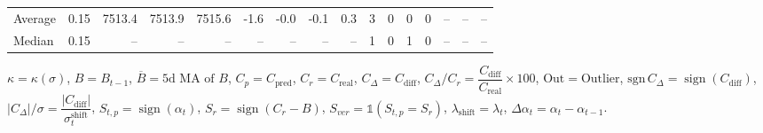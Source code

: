 \begin{threeparttable}
{\begin{tabular}{lrrrrrrrrrrrrrrr}
Average &     0.15 & 7513.4 & 7513.9 & 7515.6 &       -1.6 &           -0.0 &                     -0.1 &                 0.3 &              3 &         0 &     0 &         0 &         -- &        -- &             -- \\
 Median &     0.15 &     -- &     -- &     -- &         -- &             -- &                       -- &                  -- &              1 &         0 &     1 &         0 &         -- &        -- &             -- \\
\bottomrule
\end{tabular}
}
\begin{tablenotes}\footnotesize
\item $\kappa=\kappa(\sigma)$, $B=B_{t-1}$, $\overline{B}=\text{5d MA of }B$, $C_p=C_{\text{pred}}$, $C_r=C_{\text{real}}$, $C_\Delta=C_{\text{diff}}$, $C_\Delta/C_r=\dfrac{C_{\text{diff}}}{C_{\text{real}}}\times100$, $\mathrm{Out}=\text{Outlier}$, $\mathrm{sgn}\,C_\Delta=\operatorname{sign}(C_{\text{diff}})$, $|C_\Delta|/\sigma=\dfrac{|C_{\text{diff}}|}{\sigma_t^{\text{shift}}}$, $S_{t,p}=\operatorname{sign}(\alpha_t)$, $S_r=\operatorname{sign}(C_r - B)$, $S_{ver}=\mathbb{1}(S_{t,p}=S_r)$, $\lambda_{\text{shift}}=\lambda_t$, $\Delta\alpha_t=\alpha_t-\alpha_{t-1}$.\end{tablenotes}
\end{threeparttable}
\endgroup


